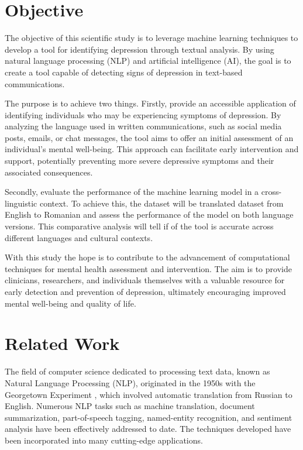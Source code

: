 \section{Objective}
\label{sec:ch1sec2}

\quad The objective of this scientific study is to leverage machine learning techniques to develop a tool for identifying depression through textual analysis. By using natural language processing (NLP) and artificial intelligence (AI), the goal is to create a tool capable of detecting signs of depression in text-based communications.

The purpose is to achieve two things. Firstly, provide an accessible application of identifying individuals who may be experiencing symptoms of depression. By analyzing the language used in written communications, such as social media posts, emails, or chat messages, the tool aims to offer an initial assessment of an individual's mental well-being. This approach can facilitate early intervention and support, potentially preventing more severe depressive symptoms and their associated consequences.

Secondly, evaluate the performance of the machine learning model in a cross-linguistic context. To achieve this, the dataset will be translated dataset from English to Romanian and assess the performance of the model on both language versions. This comparative analysis will tell if of the tool is accurate across different languages and cultural contexts.

With this study the hope is to contribute to the advancement of computational techniques for mental health assessment and intervention. The aim is to provide clinicians, researchers, and individuals themselves with a valuable resource for early detection and prevention of depression, ultimately encouraging improved mental well-being and quality of life.

\section{Related Work}

\quad The field of computer science dedicated to processing text data, known as Natural Language Processing (NLP), originated in the 1950s with the Georgetown Experiment \cite{hutchins2004georgetown}, which involved automatic translation from Russian to English. Numerous NLP tasks such as machine translation, document summarization, part-of-speech tagging, named-entity recognition, and sentiment analysis have been effectively addressed to date. The techniques developed have been incorporated into many cutting-edge applications. 

